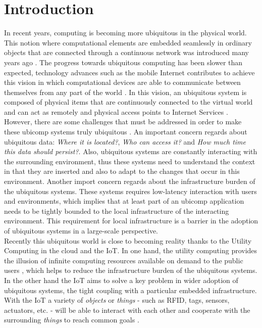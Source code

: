 
\chapter{Introduction}
\label{chapter:introduction}
In recent years, computing is becoming more ubiquitous in the physical world. This notion where
computational elements are embedded seamlessly in ordinary objects that are connected through a
continuous network was introduced many years ago \cite{weiser1991computer}. The progress
towards ubiquitous computing has been slower than expected, technology advances such as the mobile
Internet contributes to achieve this vision in which computational devices are able to communicate
between themselves from any part of the world \cite{gubbi2013internet}. In this vision, an ubiquitous
system is composed of physical items that are continuously connected to the virtual world and can act as
remotely and physical access points to Internet Services \cite{mattern2010internet}.\\

However, there are some challenges that must be addressed in order to make these \gls{ubicomp} systems
truly ubiquitous \cite{caceres2012ubicomp}. An important concern regards about ubiquitous data: \textit{Where it is located?},
\textit{Who can access it?} and \textit{How much time this data should persist?}. Also, ubiquitous systems
are constantly interacting with the surrounding environment, thus these systems need to understand
the context in that they are inserted and also to adapt to the changes that occur in this environment.
Another import concern regards about the infrastructure burden of the ubiquitous systems. These
systems requires low-latency interaction with users and environments, which implies that at least part
of an \gls{ubicomp} application needs to be tightly bounded to the local infrastructure of the interacting
environment. This requirement for local infrastructure is a barrier in the adoption of ubiquitous
systems in a large-scale perspective.\\

Recently this ubiquitous world is close to becoming reality thanks to the Utility Computing in the
cloud and the \gls{IoT}. In one hand, the utility computing provides the illusion of infinite computing
resources available on demand to the public users \cite{armbrust2010view}, which helps to reduce the
infrastructure burden of the ubiquitous systems. In the other hand the \gls{IoT} aims to solve a key
problem in wider adoption of ubiquitous systems, the tight coupling with a particular embedded
infrastructure. With the \gls{IoT} a variety of \textit{objects} or \textit{things} - such as \gls{RFID},
tags, sensors, actuators, etc. - will be able to interact with each other and cooperate with the
surrounding \textit{things} to reach common goals \cite{atzori2010internet}.\\

